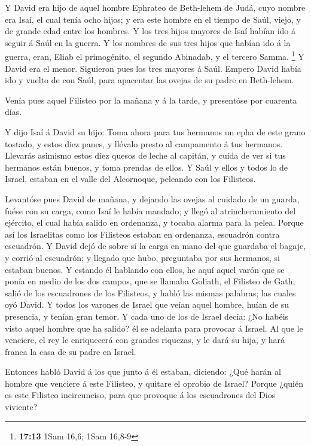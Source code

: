  Y David era hijo de aquel hombre Ephrateo de Beth-lehem de
Judá, cuyo nombre era Isaí, el cual tenía ocho hijos; y era este hombre
en el tiempo de Saúl, viejo, y de grande edad entre los hombres.
 Y los tres hijos mayores de Isaí habían ido á seguir á
Saúl en la guerra. Y los nombres de sus tres hijos que habían ido á la
guerra, eran, Eliab el primogénito, el segundo Abinadab, y el tercero
Samma. \footnote{\textbf{17:13} 1Sam 16,6; 1Sam 16,8-9}  Y
David era el menor. Siguieron pues los tres mayores á Saúl.
 Empero David había ido y vuelto de con Saúl, para
apacentar las ovejas de su padre en Beth-lehem.

 Venía pues aquel Filisteo por la mañana y á la tarde, y
presentóse por cuarenta días.

 Y dijo Isaí á David su hijo: Toma ahora para tus hermanos
un epha de este grano tostado, y estos diez panes, y llévalo presto al
campamento á tus hermanos.  Llevarás asimismo estos diez
quesos de leche al capitán, y cuida de ver si tus hermanos están buenos,
y toma prendas de ellos.  Y Saúl y ellos y todos lo de
Israel, estaban en el valle del Alcornoque, peleando con los Filisteos.

 Levantóse pues David de mañana, y dejando las ovejas al
cuidado de un guarda, fuése con su carga, como Isaí le había mandado; y
llegó al atrincheramiento del ejército, el cual había salido en
ordenanza, y tocaba alarma para la pelea.  Porque así los
Israelitas como los Filisteos estaban en ordenanza, escuadrón contra
escuadrón.  Y David dejó de sobre sí la carga en mano del
que guardaba el bagaje, y corrió al escuadrón; y llegado que hubo,
preguntaba por sus hermanos, si estaban buenos.  Y estando
él hablando con ellos, he aquí aquel varón que se ponía en medio de los
dos campos, que se llamaba Goliath, el Filisteo de Gath, salió de los
escuadrones de los Filisteos, y habló las mismas palabras; las cuales
oyó David.  Y todos los varones de Israel que veían aquel
hombre, huían de su presencia, y tenían gran temor.  Y cada
uno de los de Israel decía: ¿No habéis visto aquel hombre que ha salido?
él se adelanta para provocar á Israel. Al que le venciere, el rey le
enriquecerá con grandes riquezas, y le dará su hija, y hará franca la
casa de su padre en Israel.

 Entonces habló David á los que junto á él estaban,
diciendo: ¿Qué harán al hombre que venciere á este Filisteo, y quitare
el oprobio de Israel? Porque ¿quién es este Filisteo incircunciso, para
que provoque á los escuadrones del Dios viviente?

